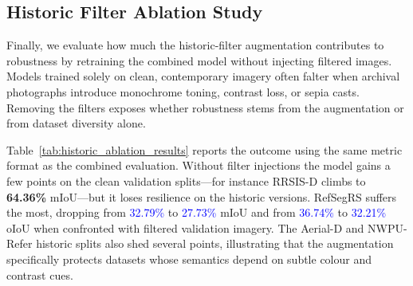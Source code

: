 \begin{table}[t]
\centering
\caption{Cost analysis: Gemma3 vs. o3 model for large-scale annotation\protect\footnotemark}
\label{tab:cost_comparison}
\end{table}

\subsection{Historic Filter Ablation Study}

Finally, we evaluate how much the historic-filter augmentation contributes to robustness by retraining the combined model without injecting filtered images. Models trained solely on clean, contemporary imagery often falter when archival photographs introduce monochrome toning, contrast loss, or sepia casts. Removing the filters exposes whether robustness stems from the augmentation or from dataset diversity alone.

Table~\ref{tab:historic_ablation_results} reports the outcome using the same metric format as the combined evaluation. Without filter injections the model gains a few points on the clean validation splits—for instance RRSIS-D climbs to \textbf{64.36\%} mIoU—but it loses resilience on the historic versions. RefSegRS suffers the most, dropping from \textcolor{blue}{32.79\%} to \textcolor{blue}{27.73\%} mIoU and from \textcolor{blue}{36.74\%} to \textcolor{blue}{32.21\%} oIoU when confronted with filtered validation imagery. The Aerial-D and NWPU-Refer historic splits also shed several points, illustrating that the augmentation specifically protects datasets whose semantics depend on subtle colour and contrast cues.

